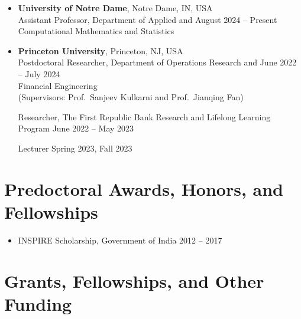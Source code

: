 \documentclass[letterpaper,oneside]{article}
\begin{document}
\begin{itemize}[leftmargin=0pt, label={}]
  \item \textbf{University of Notre Dame}, Notre Dame, IN, USA\\
  Assistant Professor, Department of Applied and \hfill August 2024 -- Present\\
  Computational Mathematics and Statistics

  \item \textbf{Princeton University}, Princeton, NJ, USA\\
  Postdoctoral Researcher, Department of Operations Research and \hfill June 2022 -- July 2024\\
   Financial Engineering \\
  (Supervisors: Prof.\ Sanjeev Kulkarni and Prof.\ Jianqing Fan)

  \quad Researcher, The First Republic Bank Research and Lifelong Learning Program \hfill June 2022 -- May 2023

  \quad Lecturer \hfill Spring 2023, Fall 2023
\end{itemize}

%
%
%
\section*{Predoctoral Awards, Honors, and Fellowships}

\begin{itemize}[leftmargin=0pt, label={}]
  \item INSPIRE Scholarship, Government of India \hfill 2012 -- 2017
%
\end{itemize}

\section*{Grants, Fellowships, and Other Funding}
\end{document}
